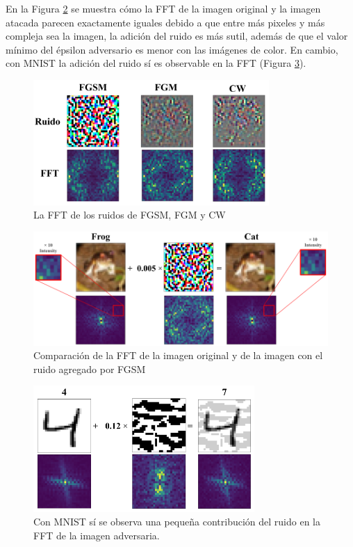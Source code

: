 En la Figura \ref{frog_cat_fft} se muestra cómo la FFT de la imagen original y la imagen atacada parecen exactamente iguales debido a que entre más pixeles y más compleja sea la imagen, la adición del ruido es más sutil, además de que el valor mínimo del épsilon adversario es menor con las imágenes de color. En cambio, con MNIST la adición del ruido sí es observable en la FFT (Figura \ref{fft_mnist}).

\begin{figure}[h!]
    \centering
    \includegraphics[width=0.8\textwidth]{images/cifar-10/frog_noises.png}
    \caption{La FFT de los ruidos de FGSM, FGM y CW}
    \label{frog_ruidos}
\end{figure}

\begin{figure}[h!]
    \centering
    \includegraphics[width=\textwidth]{images/cifar-10/frog_cat_fgsm_fft.png}
    \caption{Comparación de la FFT de la imagen original y de la imagen con el ruido agregado por FGSM}
    \label{frog_cat_fft}
\end{figure}

\begin{figure}[h!]
    \centering
    \includegraphics[width=0.75\textwidth]{images/mnist/ffts.png}
    \caption{Con MNIST sí se observa una pequeña contribución del ruido en la FFT de la imagen adversaria.}
    \label{fft_mnist}
\end{figure}


